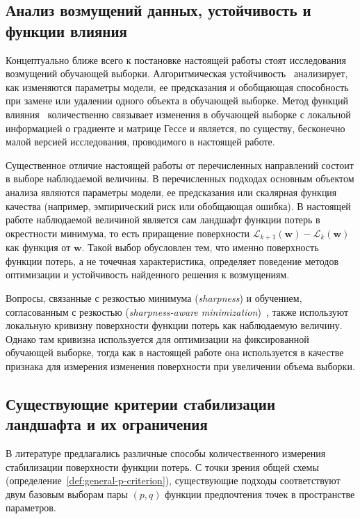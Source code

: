 \subsection{Анализ возмущений данных, устойчивость и функции влияния}\label{subsec:stability-review}

Концептуально ближе всего к постановке настоящей работы стоят исследования возмущений обучающей выборки. Алгоритмическая устойчивость~\cite{bousquet2002stability,hardt2016train,feldman2019high,bousquet2020sharper} анализирует, как изменяются параметры модели, ее предсказания и обобщающая способность при замене или удалении одного объекта в обучающей выборке. Метод функций влияния~\cite{koh2017influence,giordano2019swiss,koh2019group,basu2020secondorder} количественно связывает изменения в обучающей выборке с локальной информацией о градиенте и матрице Гессе и является, по существу, бесконечно малой версией исследования, проводимого в настоящей работе.

Существенное отличие настоящей работы от перечисленных направлений состоит в выборе наблюдаемой величины. В перечисленных подходах основным объектом анализа являются параметры модели, ее предсказания или скалярная функция качества (например, эмпирический риск или обобщающая ошибка). В настоящей работе наблюдаемой величиной является сам ландшафт функции потерь в окрестности минимума, то есть приращение поверхности $\mathcal L_{k+1}(\mathbf w)-\mathcal L_k(\mathbf w)$ как функция от $\mathbf w$. Такой выбор обусловлен тем, что именно поверхность функции потерь, а не точечная характеристика, определяет поведение методов оптимизации и устойчивость найденного решения к возмущениям.

Вопросы, связанные с резкостью минимума (\emph{sharpness}) и обучением, согласованным с резкостью (\emph{sharpness-aware minimization})~\cite{keskar2017largebatch,dinh2017sharp,foret2021sam}, также используют локальную кривизну поверхности функции потерь как наблюдаемую величину. Однако там кривизна используется для оптимизации на фиксированной обучающей выборке, тогда как в настоящей работе она используется в качестве признака для измерения изменения поверхности при увеличении объема выборки.

\subsection{Существующие критерии стабилизации ландшафта и их ограничения}\label{subsec:existing-criteria}

В литературе предлагались различные способы количественного измерения стабилизации поверхности функции потерь. С точки зрения общей схемы (определение~\ref{def:general-p-criterion}), существующие подходы соответствуют двум базовым выборам пары $(p, q)$ функции предпочтения точек в пространстве параметров.

